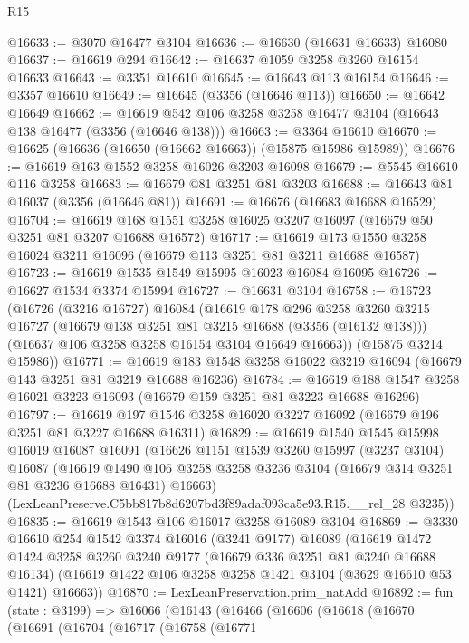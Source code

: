 \begin{lexlean}{R15}
\begin{coremodule}
@16633 := @3070 @16477 @3104
@16636 := @16630 (@16631 @16633) @16080
@16637 := @16619 @294
@16642 := @16637 @1059 @3258 @3260 @16154 @16633
@16643 := @3351 @16610
@16645 := @16643 @113 @16154
@16646 := @3357 @16610
@16649 := @16645 (@3356 (@16646 @113))
@16650 := @16642 @16649
@16662 := @16619 @542 @106 @3258 @3258 @16477 @3104 (@16643 @138 @16477 (@3356 (@16646 @138)))
@16663 := @3364 @16610
@16670 := @16625 (@16636 (@16650 (@16662 @16663)) (@15875 @15986 @15989))
@16676 := @16619 @163 @1552 @3258 @16026 @3203 @16098
@16679 := @5545 @16610 @116 @3258
@16683 := @16679 @81 @3251 @81 @3203
@16688 := @16643 @81 @16037 (@3356 (@16646 @81))
@16691 := @16676 (@16683 @16688 @16529)
@16704 := @16619 @168 @1551 @3258 @16025 @3207 @16097 (@16679 @50 @3251 @81 @3207 @16688 @16572)
@16717 := @16619 @173 @1550 @3258 @16024 @3211 @16096 (@16679 @113 @3251 @81 @3211 @16688 @16587)
@16723 := @16619 @1535 @1549 @15995 @16023 @16084 @16095
@16726 := @16627 @1534 @3374 @15994
@16727 := @16631 @3104
@16758 := @16723
    (@16726
      (@3216 @16727)
      @16084
      (@16619
        @178
        @296
        @3258
        @3260
        @3215
        @16727
        (@16679 @138 @3251 @81 @3215 @16688 (@3356 (@16132 @138)))
        (@16637 @106 @3258 @3258 @16154 @3104 @16649 @16663))
      (@15875 @3214 @15986))
@16771 := @16619 @183 @1548 @3258 @16022 @3219 @16094 (@16679 @143 @3251 @81 @3219 @16688 @16236)
@16784 := @16619 @188 @1547 @3258 @16021 @3223 @16093 (@16679 @159 @3251 @81 @3223 @16688 @16296)
@16797 := @16619 @197 @1546 @3258 @16020 @3227 @16092 (@16679 @196 @3251 @81 @3227 @16688 @16311)
@16829 := @16619
    @1540
    @1545
    @15998
    @16019
    @16087
    @16091
    (@16626
      @1151
      @1539
      @3260
      @15997
      (@3237 @3104)
      @16087
      (@16619 @1490 @106 @3258 @3258 @3236 @3104 (@16679 @314 @3251 @81 @3236 @16688 @16431) @16663)
      (LexLeanPreserve.C5bb817b8d6207bd3f89adaf093ca5e93.R15.__rel_28 @3235))
@16835 := @16619 @1543 @106 @16017 @3258 @16089 @3104
@16869 := @3330
    @16610
    @254
    @1542
    @3374
    @16016
    (@3241 @9177)
    @16089
    (@16619
      @1472
      @1424
      @3258
      @3260
      @3240
      @9177
      (@16679 @336 @3251 @81 @3240 @16688 @16134)
      (@16619 @1422 @106 @3258 @3258 @1421 @3104 (@3629 @16610 @53 @1421) @16663))
@16870 := LexLeanPreservation.prim_natAdd
@16892 := fun (state : @3199) =>
  @16066
    (@16143
      (@16466
        (@16606
          (@16618
            (@16670
              (@16691
                (@16704
                  (@16717
                    (@16758
                      (@16771

\end{coremodule}
\end{lexlean}
